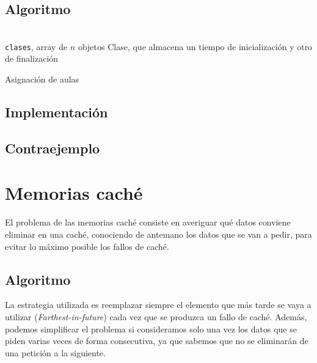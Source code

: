 \documentclass[a4paper, 11pt]{article} %
\let\emptyset\varnothing
\begin{document}
  \subsection{Algoritmo}
\begin{algorithm}[H]
	\begin{algorithmic}[1]
		\REQUIRE \ \\
        	\texttt{clases}, array de $n$ objetos Clase, que almacena
				 un tiempo de inicialización y otro de 
				 finalización\\
	  \WHILE{\texttt{sin\_colorear}$\neq \emptyset$}
	      \ENDIF
	    \ENDFOR
	    
	  \ENDWHILE
	\end{algorithmic}
    \caption{Asignación de aulas}
    \label{aulas}
\end{algorithm}

\subsection{Implementación}
\subsection{Contraejemplo}

\section{Memorias caché}
\label{cache}
El problema de las memorias caché consiste en averiguar qué datos conviene eliminar en una caché, conociendo de antemano los datos que se van a pedir, para evitar lo máximo posible los fallos de caché.
  \subsection{Algoritmo}
La estrategia utilizada es reemplazar siempre el elemento que más tarde se vaya a utilizar (\textit{Farthest-in-future}) cada vez que se produzca un fallo de caché. Además, podemos simplificar el problema si consideramos solo una vez los datos que se piden varias veces de forma consecutiva, ya que sabemos que no se eliminarán de una petición a la siguiente.
\end{document}
